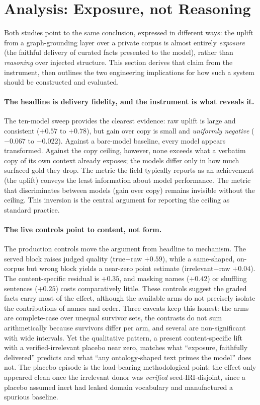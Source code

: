 \documentclass[10pt,twocolumn]{article}
\begin{document}
\section{Analysis: Exposure, not Reasoning}\label{sec:analysis}
Both studies point to the same conclusion, expressed in different ways: the uplift from a graph-grounding layer over a private corpus is almost entirely \emph{exposure} (the faithful delivery of curated facts presented to the model), rather than \emph{reasoning} over injected structure. This section derives that claim from the instrument, then outlines the two engineering implications for how such a system should be constructed and evaluated.

\paragraph{The headline is delivery fidelity, and the instrument is what reveals it.} The ten-model sweep provides the clearest evidence: raw uplift is large and consistent ($+0.57$ to $+0.78$), but gain over copy is small and \emph{uniformly negative} ($-0.067$ to $-0.022$). Against a bare-model baseline, every model appears transformed. Against the copy ceiling, however, none exceeds what a verbatim copy of its own context already exposes; the models differ only in how much surfaced gold they drop. The metric the field typically reports as an achievement (the uplift) conveys the least information about model performance. The metric that discriminates between models (gain over copy) remains invisible without the ceiling. This inversion is the central argument for reporting the ceiling as standard practice.

\paragraph{The live controls point to content, not form.} The production controls move the argument from headline to mechanism. The served block raises judged quality (true$-$raw $+0.59$), while a same-shaped, on-corpus but wrong block yields a near-zero point estimate (irrelevant$-$raw $+0.04$). The content-specific residual is $+0.35$, and masking names ($+0.42$) or shuffling sentences ($+0.25$) costs comparatively little. These controls suggest the graded facts carry most of the effect, although the available arms do not precisely isolate the contributions of names and order. Three caveats keep this honest: the arms are complete-case over unequal survivor sets, the contrasts do not sum arithmetically because survivors differ per arm, and several are non-significant with wide intervals. Yet the qualitative pattern, a present content-specific lift with a verified-irrelevant placebo near zero, matches what ``exposure, faithfully delivered'' predicts and what ``any ontology-shaped text primes the model'' does not. The placebo episode is the load-bearing methodological point: the effect only appeared clean once the irrelevant donor was \emph{verified} seed-IRI-disjoint, since a placebo assumed inert had leaked domain vocabulary and manufactured a spurious baseline.
\end{document}
